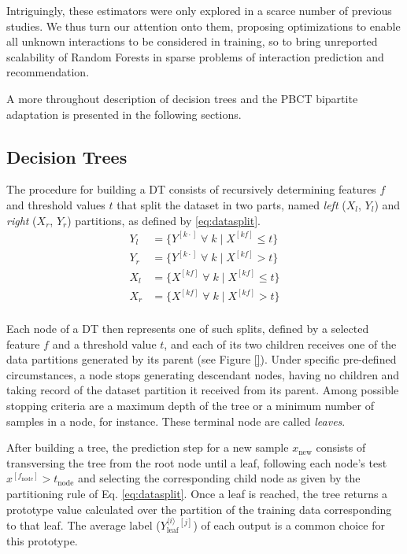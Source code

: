 \documentclass[conference]{IEEEtran}
\newcommand{\el}[1]{^{[#1]}}
\newcommand{\mel}[1]{^{\langle #1 \rangle}}
\begin{document}
Intriguingly, these estimators were only explored in a scarce number of previous studies\cite{}. We thus turn our attention onto them, proposing optimizations to enable all unknown interactions to be considered in training, so to bring unreported scalability of Random Forests in sparse problems of interaction prediction and recommendation.

A more throughout description of decision trees and the PBCT bipartite adaptation is presented in the following sections.


\subsection{Decision Trees}
\label{sec:dt}

The procedure for building a DT consists of recursively determining features $f$ and threshold values $t$ that split the dataset in two parts, named \emph{left} ($X_l$, $Y_l$) and \emph{right} ($X_r$, $Y_r$) partitions, as defined by \ref{eq:datasplit}.
%
\begin{equation}
    \begin{split} %
        Y_l &=\{Y\el{k\cdot} \;\forall\; k \mid X\el{kf} \le t\}\\
        Y_r &=\{Y\el{k\cdot} \;\forall\; k \mid X\el{kf} > t\}\\
        X_l &=\{X\el{kf} \;\forall\; k \mid X\el{kf} \le t\}\\
        X_r &=\{X\el{kf} \;\forall\; k \mid X\el{kf} > t\}\\
    \end{split}
    \label{eq:datasplit}
\end{equation}

Each node of a DT then represents one of such splits, defined by a selected feature $f$ and a threshold value $t$, and each of its two children receives one of the data partitions generated by its parent (see Figure \ref{}). Under specific pre-defined circumstances, a node stops generating descendant nodes, having no children and taking record of the dataset partition it received from its parent. Among possible stopping criteria are a maximum depth of the tree or a minimum number of samples in a node, for instance. These terminal node are called \emph{leaves}.

After building a tree, the prediction step for a new sample $x_\text{new}$ consists of transversing the tree from the root node until a leaf, following each node's test $x\el{f_\text{node}} > t_\text{node}$ and selecting the corresponding child node as given by the partitioning rule of Eq. \ref{eq:datasplit}. Once a leaf is reached, the tree returns a prototype value calculated over the partition of the training data corresponding to that leaf. The average label ($Y_\text{leaf} \mel i\el j$) of each output is a common choice for this prototype.
\end{document}
